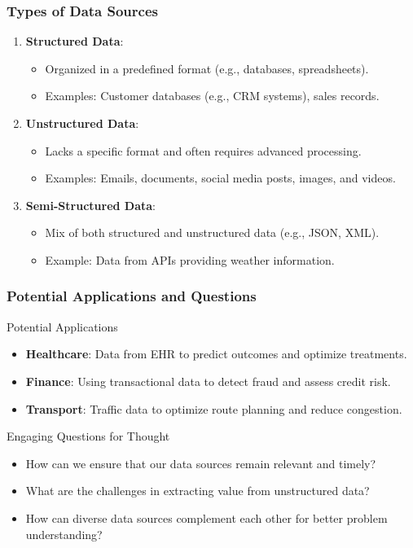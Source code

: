 \documentclass[aspectratio=169]{beamer}
\begin{document}
\begin{frame}[fragile]
    \frametitle{Types of Data Sources}
    \begin{enumerate}
        \item \textbf{Structured Data}:
        \begin{itemize}
            \item Organized in a predefined format (e.g., databases, spreadsheets).
            \item Examples: Customer databases (e.g., CRM systems), sales records.
        \end{itemize}
        
        \item \textbf{Unstructured Data}:
        \begin{itemize}
            \item Lacks a specific format and often requires advanced processing.
            \item Examples: Emails, documents, social media posts, images, and videos.
        \end{itemize}

        \item \textbf{Semi-Structured Data}:
        \begin{itemize}
            \item Mix of both structured and unstructured data (e.g., JSON, XML).
            \item Example: Data from APIs providing weather information.
        \end{itemize}
    \end{enumerate}
\end{frame}

\begin{frame}[fragile]
    \frametitle{Potential Applications and Questions}
    \begin{block}{Potential Applications}
        \begin{itemize}
            \item \textbf{Healthcare}: Data from EHR to predict outcomes and optimize treatments.
            \item \textbf{Finance}: Using transactional data to detect fraud and assess credit risk.
            \item \textbf{Transport}: Traffic data to optimize route planning and reduce congestion.
        \end{itemize}
    \end{block}

    \begin{block}{Engaging Questions for Thought}
        \begin{itemize}
            \item How can we ensure that our data sources remain relevant and timely?
            \item What are the challenges in extracting value from unstructured data?
            \item How can diverse data sources complement each other for better problem understanding?
        \end{itemize}
    \end{block}
\end{frame}
\end{document}
